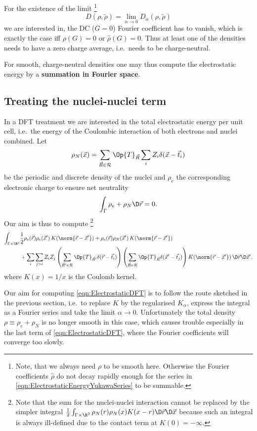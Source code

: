 \documentclass{MFHarticle}
\begin{document}
For the existence of the limit%
\footnote{Note, that we always need $\rho$ to be smooth here.
	Otherwise the Fourier coefficients $\hat{\rho}$ do not decay rapidly enough
	for the series in \eqref{eqn:ElectrostaticEnergyYukawaSeries}
	to be summable.}
\[ D(\rho, \tilde{\rho}) = \lim_{\alpha \to 0} D_\alpha(\rho, \tilde{\rho}) \]
we are interested in, the DC ($G = 0$) Fourier coefficient has to vanish,
which is exactly the case iff $\rho(G) =0$ or $\hat{\rho}(G) = 0$.
Thus at least one of the densities needs to have a zero charge average,
i.e.~needs to be charge-neutral.

For smooth, charge-neutral densities one may thus compute
the electrostatic energy by a \textbf{summation in Fourier space}.

\subsection{Treating the nuclei-nuclei term}
In a DFT treatment we are interested in the total electrostatic energy
per unit cell, i.e.~the energy of the Coulombic interaction of both
electrons and nuclei combined.
Let
\[
	\rho_N(\vec{x}) = \sum_{\vec{R}\in \mathcal{R}} \Op{T}_{\vec{R}}
	\sum_i Z_i \delta(\vec{x} - \vec{t}_i)
\]
be the periodic and discrete density of the nuclei
and $\rho_e$ the corresponding electronic charge to ensure net
neutrality
\[\int_\Gamma \rho_e + \rho_N \D\vec{r} = 0. \]
Our aim is thus to compute%
\footnote{Note that the sum for the nuclei-nuclei interaction
cannot be replaced
by the simpler integral
$\frac12 \int_{\Gamma \times \R^3} \rho_N(r) \rho_N(x) K(x-r)\D \vec{r} \D \vec{x}$
because such an integral is always ill-defined due to the
contact term at $K(0) = -\infty$.}
\begin{align}
	\nonumber
	\int_{\Gamma \times \R^3}
	&\frac12\rho_e(\vec{r}) \rho_e(\vec{x}') \, K\!\left(\norm{\vec{r}-\vec{x}'}\right)
	+\rho_e(\vec{r}) \rho_N(\vec{x}') \, K\!\left(\norm{\vec{r}-\vec{x}'}\right) \\
	&+
	\sum_i
	\sum_{j>i} Z_i Z_j
	\left(
	\sum_{\vec{R}'\in \mathcal{R}}
	\Op{T}_{\vec{R}'}
	\delta(\vec{r} - \vec{t}_i)
	\right)
	\left(
	\sum_{\vec{R}\in \mathcal{R}}
	\Op{T}_{\vec{R}}
	\delta(\vec{x}' - \vec{t}_j)
	\right)
	K\!\left(\norm{\vec{r}-\vec{x}'}\right)
	\D\vec{r} \D\vec{x}'.
	\label{eqn:ElectrostaticDFT}
\end{align}
where $K(x) = 1/x$ is the Coulomb kernel.

Our aim for computing \eqref{eqn:ElectrostaticDFT}
is to follow the route sketched in the previous section,
i.e.~to replace $K$ by the regularised $K_\alpha$,
express the integral as a Fourier series and take
the limit $\alpha\to0$.
Unfortunately the total density $\rho \equiv \rho_e + \rho_N$
is no longer smooth in this case,
which causes trouble especially in
the last term of \eqref{eqn:ElectrostaticDFT},
where the Fourier coefficients will converge too slowly.
\end{document}
